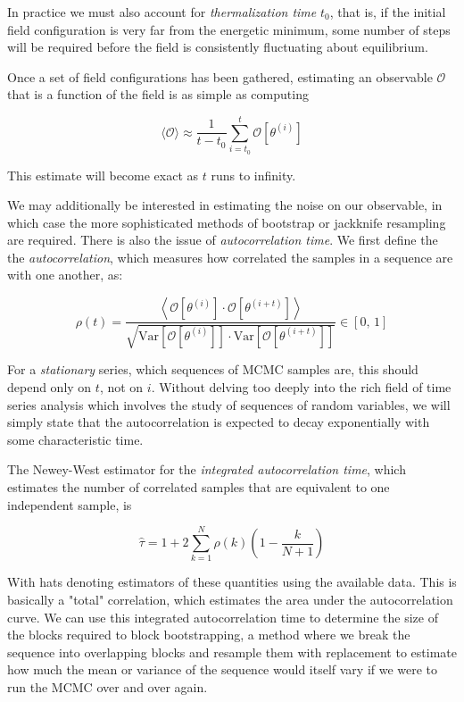 \documentclass[12pt]{article}
\begin{document}
In practice we must also account for \textit{thermalization time} $t_0$, that is, if the initial field configuration is very far from the energetic minimum, some number of steps
will be required before the field is consistently fluctuating about equilibrium.

Once a set of field configurations has been gathered, estimating an observable $\mathcal{O}$ that is a function of the field is as simple as computing

\begin{equation*}
	\langle \mathcal{O} \rangle \approx \frac{1}{t-t_0} \sum_{i=t_0}^{t} \mathcal{O}[\theta^{(i)}]
\end{equation*}

This estimate will become exact as $t$ runs to infinity.

We may additionally be interested in estimating the noise on our observable, in which case the more sophisticated methods of bootstrap or jackknife resampling
are required. There is also the issue of \textit{autocorrelation time}. We first define the the \textit{autocorrelation}, which measures how correlated 
the samples in a sequence are with one another, as:

\begin{equation*}
	\rho(t) = \frac{\left\langle \mathcal{O}[\theta^{(i)}]\cdot\mathcal{O}[\theta^{(i+t)}] \right\rangle}{\sqrt{\mathrm{Var}[\mathcal{O}[\theta^{(i)}]]\cdot\mathrm{Var}[\mathcal{O}[\theta^{(i+t)}]]}}
	\in [0,\,1]
\end{equation*}

For a \textit{stationary} series, which sequences of MCMC samples are, this should depend only on $t$, not on $i$. Without delving too deeply into the rich field of time series analysis which involves the study of sequences of random variables, 
we will simply state that the autocorrelation is expected to decay exponentially with some characteristic time.

The Newey-West estimator for the \textit{integrated autocorrelation time}, which estimates the number of correlated samples that are equivalent to one independent sample, is 

\begin{equation}
	\hat{\tau} = 1 + 2\sum_{k=1}^{N}\hat{\rho}(k)\left(1 - \frac{k}{N+1} \right)
\end{equation}

With hats denoting estimators of these quantities using the available data. This is basically a "total" correlation, which estimates the area under the autocorrelation curve. We can use this integrated autocorrelation time to 
determine the size of the blocks required to block bootstrapping, a method where we break the sequence into overlapping blocks and 
resample them with replacement to estimate how much the mean or variance of the sequence would itself vary if we were to run the MCMC over and over again.
\end{document}
